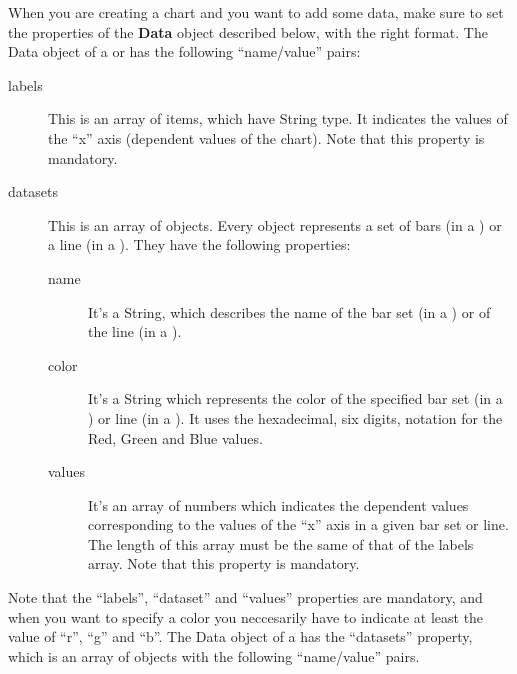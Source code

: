 			When you are creating a chart and you want to add some data, make sure to set the properties of the \textbf{Data} object described below, with the right format.
			 \label{sec:dataBarLine}
				The Data object of a  or  has the following “name/value” pairs:
				\begin{description}
					\item[labels] This is an array of items, which have String type. It indicates the values of the “x” axis (dependent values of the chart). Note that this property is mandatory.
					\item[datasets] This is an array of objects. Every object represents a set of bars (in a ) or a line (in a ). They have the following properties: 
					\begin{description}
						\item[name] It's a String, which describes the name of the bar set (in a ) or of the line (in a ). 
						\item[color] It's a String which represents the color of the specified bar set (in a ) or line (in a ). It uses the hexadecimal, six digits, notation for the Red, Green and Blue values. 
						\item[values] It's an array of numbers which indicates the dependent values corresponding to the values of the “x” axis in a given bar set or line. The length of this array must be the same of that of the labels array. Note that this property is mandatory.
					\end{description}
				\end{description}
				Note that the “labels”, “dataset” and “values” properties are mandatory, and when you want to specify a color you neccesarily have to indicate at least the value of “r”, “g” and “b”.
				The Data object of a  has the “datasets” property, which is an array of objects with the following “name/value” pairs.
